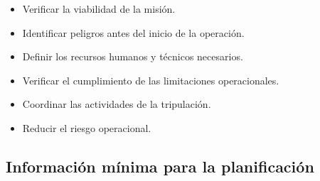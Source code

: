 \begin{itemize}

\item Verificar la viabilidad de la misión.

\item Identificar peligros antes del inicio de la operación.

\item Definir los recursos humanos y técnicos necesarios.

\item Verificar el cumplimiento de las limitaciones operacionales.

\item Coordinar las actividades de la tripulación.

\item Reducir el riesgo operacional.

\end{itemize}



\subsection{Información mínima para la planificación}

\renewcommand{\arraystretch}{1.3}

